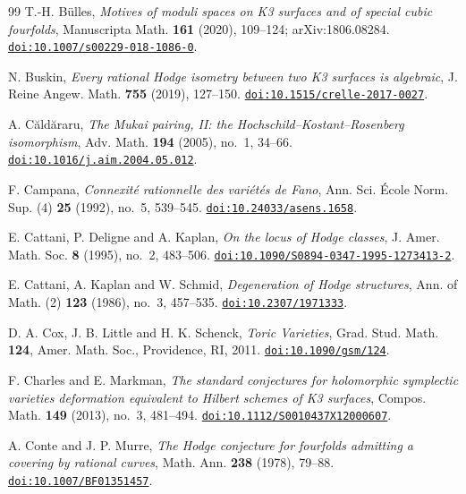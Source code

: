 \begin{thebibliography}{99}
T.-H. B\"ulles,
\emph{Motives of moduli spaces on K3 surfaces and of special cubic
fourfolds},
Manuscripta Math. \textbf{161} (2020), 109--124; arXiv:1806.08284.
\href{https://doi.org/10.1007/s00229-018-1086-0}{\texttt{doi:10.1007/s00229-018-1086-0}}.

N. Buskin,
\emph{Every rational Hodge isometry between two K3 surfaces is algebraic},
J. Reine Angew. Math. \textbf{755} (2019), 127--150.
\href{https://doi.org/10.1515/crelle-2017-0027}{\texttt{doi:10.1515/crelle-2017-0027}}.

A. C\u{a}ld\u{a}raru,
\emph{The Mukai pairing, II: the Hochschild--Kostant--Rosenberg isomorphism},
Adv. Math. \textbf{194} (2005), no.~1, 34--66.
\href{https://doi.org/10.1016/j.aim.2004.05.012}{\texttt{doi:10.1016/j.aim.2004.05.012}}.

F. Campana,
\emph{Connexit\'e rationnelle des vari\'et\'es de Fano},
Ann. Sci. \'Ecole Norm. Sup. (4) \textbf{25} (1992), no.~5, 539--545.
\href{https://doi.org/10.24033/asens.1658}{\texttt{doi:10.24033/asens.1658}}.

E. Cattani, P. Deligne and A. Kaplan,
\emph{On the locus of Hodge classes},
J. Amer. Math. Soc. \textbf{8} (1995), no.~2, 483--506.
\href{https://doi.org/10.1090/S0894-0347-1995-1273413-2}{\texttt{doi:10.1090/S0894-0347-1995-1273413-2}}.

E. Cattani, A. Kaplan and W. Schmid,
\emph{Degeneration of Hodge structures},
Ann. of Math. (2) \textbf{123} (1986), no.~3, 457--535.
\href{https://doi.org/10.2307/1971333}{\texttt{doi:10.2307/1971333}}.

D. A. Cox, J. B. Little and H. K. Schenck,
\emph{Toric Varieties},
Grad. Stud. Math. \textbf{124}, Amer. Math. Soc., Providence, RI, 2011.
\href{https://doi.org/10.1090/gsm/124}{\texttt{doi:10.1090/gsm/124}}.

F. Charles and E. Markman,
\emph{The standard conjectures for holomorphic symplectic varieties
deformation equivalent to Hilbert schemes of K3 surfaces},
Compos. Math. \textbf{149} (2013), no.~3, 481--494.
\href{https://doi.org/10.1112/S0010437X12000607}{\texttt{doi:10.1112/S0010437X12000607}}.

A. Conte and J. P. Murre,
\emph{The Hodge conjecture for fourfolds admitting a covering by rational
curves},
Math. Ann. \textbf{238} (1978), 79--88.
\href{https://doi.org/10.1007/BF01351457}{\texttt{doi:10.1007/BF01351457}}.


\end{thebibliography}
